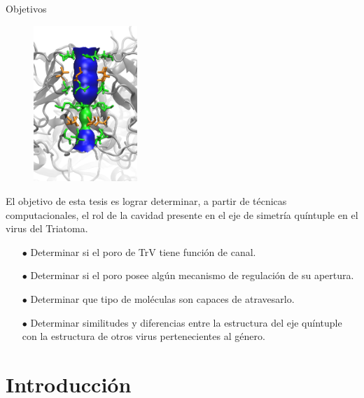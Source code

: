 \documentclass[8pt]{beamer}
\begin{document}
\begin{frame}[t]{Objetivos}
\justifying
\begin{figure}
\vspace{-0.5cm}
\Centering
\includegraphics[width=0.35\textwidth]{Figure/TrV_SIdeview_Pore_2.png}
\end{figure}

El objetivo de esta tesis es lograr determinar, a partir de técnicas computacionales, el rol de la cavidad presente en el eje de simetría quíntuple en el virus del Triatoma.
\begin{itemize}
\justifying
\item[$\bullet$] Determinar si el poro de TrV tiene función de canal.
\item[$\bullet$] Determinar si el poro posee algún mecanismo de regulación de su apertura.
\item[$\bullet$] Determinar que tipo de moléculas son capaces de atravesarlo.
\item[$\bullet$] Determinar similitudes y diferencias entre la estructura del eje quíntuple con la estructura de otros virus pertenecientes al género.
\end{itemize}

\end{frame}

\begin{frame}[t]{}
  \tableofcontents
\end{frame}


\section{Introducción}
\end{document}
